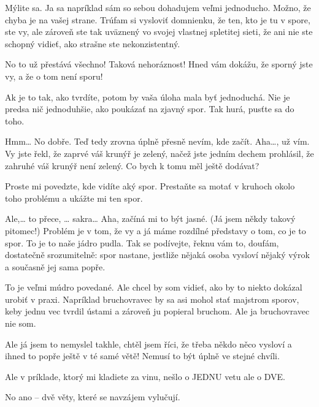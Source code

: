 \documentclass[12pt]{article}
\begin{document}
\begin{description}[itemsep=0pt]
\item[Ž:] Mýlite sa. Ja sa napríklad sám so sebou dohadujem veľmi jednoducho. Možno, že chyba je na vašej strane. Trúfam si vysloviť domnienku, že ten, kto je tu v spore, ste vy, ale zároveň ste tak uväznený vo svojej vlastnej spletitej sieti, že ani nie ste schopný vidieť, ako strašne ste nekonzistentný.

\item[A:] No to už přestává všechno! Taková nehoráznost! Hned vám dokážu, že
    sporný jste vy, a že o tom není sporu!

\item[Ž:] Ak je to tak, ako tvrdíte, potom by vaša úloha mala byť jednoduchá. Nie je predsa nič jednoduhšie, ako poukázať na zjavný spor. Tak hurá, pusťte sa do toho.

\item[A:] Hmm… No dobře. Teď tedy zrovna úplně přesně nevím, kde začít.
    Aha…, už vím. Vy jste řekl, že zaprvé váš krunýř je zelený, načež jste jedním
    dechem prohlásil, že zahruhé váš krunýř není zelený. Co bych k tomu měl
    ještě dodávat?

\item[Ž:] Proste mi povedzte, kde vidíte aký spor. Prestaňte sa motať v kruhoch okolo toho problému a ukážte mi ten spor.

\item[A:] Ale,… to přece, … sakra… Aha, začíná mi to být jasné. (Já jsem někdy takový
    pitomec!) Problém je v tom, že vy a já máme rozdílné představy o tom, co je to spor.
    To je to naše jádro pudla. Tak se podívejte, řeknu vám to, doufám, dostatečně
    srozumitelně: spor nastane, jestliže nějaká osoba vysloví nějaký výrok a současně
    jej sama popře.

\item[Ž:] To je veľmi múdro povedané. Ale chcel by som vidieť, ako by to niekto dokázal urobiť v praxi. Napríklad bruchovravec by sa asi mohol stať majstrom sporov, keby jednu vec tvrdil ústami a zároveň ju popieral bruchom. Ale ja bruchovravec nie som.

\item[A:] Ale já jsem to nemyslel takhle, chtěl jsem říci, že třeba někdo
    něco vysloví a ihned to popře ještě v té samé větě! Nemusí to být úplně ve stejné
    chvíli.

\item[Ž:] Ale v príklade, ktorý mi kladiete za vinu, nešlo o JEDNU vetu ale o DVE.

\item[A:] No ano -- dvě věty, které se navzájem vylučují.


\end{description}
\end{document}
